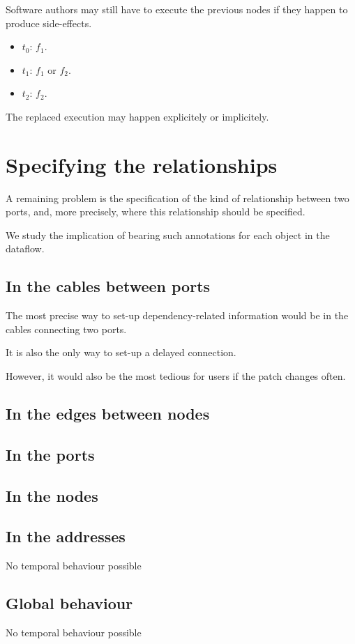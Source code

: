 \documentclass{article}
\begin{document}
Software authors may still have to execute the previous nodes if they happen to produce side-effects.
    
\begin{itemize}
  \item $t_0$: $f_1$.
  \item $t_1$: $f_1$ or $f_2$.
  \item $t_2$: $f_2$. 
\end{itemize}

The replaced execution may happen explicitely or implicitely.
    
\section{Specifying the relationships}
A remaining problem is the specification of the kind of relationship between two ports, and, more precisely, 
where this relationship should be specified.
    
We study the implication of bearing such annotations for each object in the dataflow.

\subsection{In the cables between ports}
The most precise way to set-up dependency-related information would be in 
the cables connecting two ports. 
    
It is also the only way to set-up a delayed connection.
    
However, it would also be the most tedious for users if the patch changes often.
    
\subsection{In the edges between nodes}


\subsection{In the ports}
\subsection{In the nodes}
\subsection{In the addresses}
No temporal behaviour possible
\subsection{Global behaviour}
No temporal behaviour possible
\end{document}
